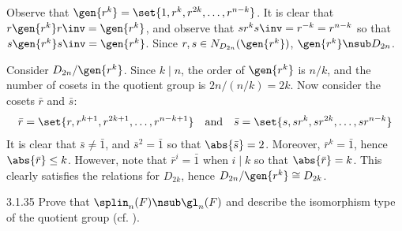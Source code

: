 \begin{solenum}
    \item Observe that $\gen{r^k} = \set{1, r^k, r^{2k}, \ldots, r^{n - k}}$.
	It is clear that $r\gen{r^k}r\inv = \gen{r^k}$, and observe that $sr^ks\inv = r^{-k} = r^{n - k}$ so that $s\gen{r^k}s\inv = \gen{r^k}$.
	Since $r, s \in N_{D_{2n}}(\gen{r^k})$, $\gen{r^k} \nsub D_{2n}$.
    \item Consider $D_{2n}/\gen{r^k}$.
	Since $k \mid n$, the order of $\gen{r^k}$ is $n/k$, and the number of cosets in the quotient group is $2n/(n/k) = 2k$.
	Now consider the cosets $\bar r$ and $\bar s$:
    \[
    	\bar r = \set{r, r^{k + 1}, r^{2k + 1}, \ldots, r^{n - k + 1}} \quad \text{and} \quad \bar s = \set{s, sr^k, sr^{2k}, \ldots, sr^{n - k}}
    \]
    It is clear that $\bar s \neq \bar 1$, and $\bar s^2 = \bar 1$ so that $\abs{\bar s} = 2$.
	Moreover, $\bar r^k = \bar 1$, hence $\abs{\bar r} \leq k$.
	However, note that $\bar r^i = \bar 1$ when $i \mid k$ so that $\abs{\bar r} = k$.
	This clearly satisfies the relations for $D_{2k}$, hence $D_{2n}/\gen{r^k} \cong D_{2k}$. 
\end{solenum}

\begin{spex}{3.1.35} 
    Prove that $\splin_n(F) \nsub \gl_n(F)$ and describe the isomorphism type of the quotient group (cf. ).
\end{spex}

